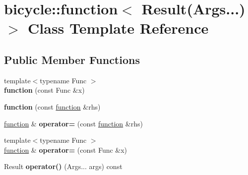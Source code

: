 \hypertarget{classbicycle_1_1function_3_01_result_07_args_8_8_8_08_4}{}\section{bicycle\+:\+:function$<$ Result(Args...)$>$ Class Template Reference}
\label{classbicycle_1_1function_3_01_result_07_args_8_8_8_08_4}
\subsection*{Public Member Functions}
\begin{DoxyCompactItemize}
\item 
\mbox{\label{classbicycle_1_1function_3_01_result_07_args_8_8_8_08_4_a406cca8012390e9d9c7beb625fc2f8be}} 
{\footnotesize template$<$typename Func $>$ }\\{\bfseries function} (const Func \&x)
\item 
\mbox{\label{classbicycle_1_1function_3_01_result_07_args_8_8_8_08_4_a2de0e18109cc2ffd292e7469019e60bf}} 
{\bfseries function} (const \hyperlink{classbicycle_1_1function}{function} \&rhs)
\item 
\mbox{\label{classbicycle_1_1function_3_01_result_07_args_8_8_8_08_4_a05d7b7d0ff1d9d0e543e23c17c08ee1d}} 
\hyperlink{classbicycle_1_1function}{function} \& {\bfseries operator=} (const \hyperlink{classbicycle_1_1function}{function} \&rhs)
\item 
\mbox{\label{classbicycle_1_1function_3_01_result_07_args_8_8_8_08_4_a35979bc6f350a35287291d811016f442}} 
{\footnotesize template$<$typename Func $>$ }\\\hyperlink{classbicycle_1_1function}{function} \& {\bfseries operator=} (const Func \&x)
\item 
\mbox{\label{classbicycle_1_1function_3_01_result_07_args_8_8_8_08_4_a35bdb499145776c993b6b6b7ae8432cf}} 
Result {\bfseries operator()} (Args... args) const
\end{DoxyCompactItemize}
